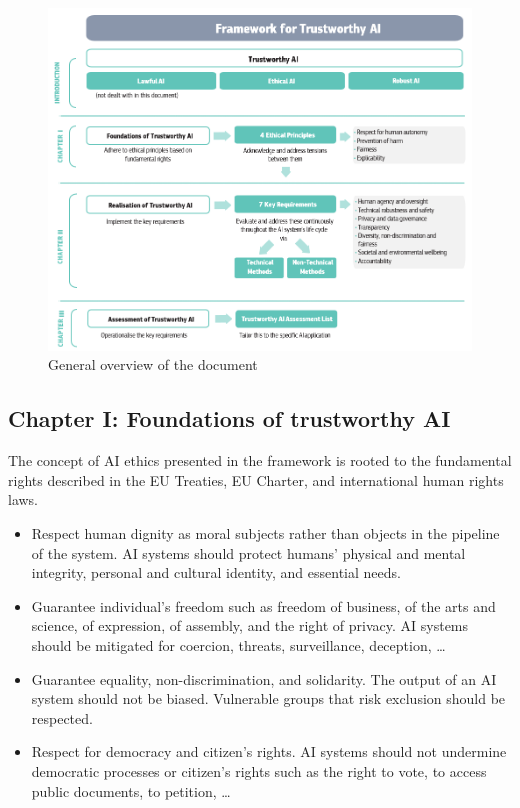 \begin{figure}[h]
    \centering
    \includegraphics[width=0.9\linewidth]{./img/hleg_ethics_guidelines.png}
    \caption{General overview of the document}
\end{figure}


\subsection{Chapter I: Foundations of trustworthy AI} \label{sec:hleg_ch1}

The concept of AI ethics presented in the framework is rooted to the fundamental rights described in the EU Treaties, EU Charter, and international human rights laws.

\begin{remark}
    \phantom{}
    \begin{itemize}
        \item Respect human dignity as moral subjects rather than objects in the pipeline of the system. AI systems should protect humans' physical and mental integrity, personal and cultural identity, and essential needs.
        \item Guarantee individual's freedom such as freedom of business, of the arts and science, of expression, of assembly, and the right of privacy. AI systems should be mitigated for coercion, threats, surveillance, deception, \dots
        \item Guarantee equality, non-discrimination, and solidarity. The output of an AI system should not be biased. Vulnerable groups that risk exclusion should be respected.
        \item Respect for democracy and citizen's rights. AI systems should not undermine democratic processes or citizen's rights such as the right to vote, to access public documents, to petition, \dots
    \end{itemize}
\end{remark}


